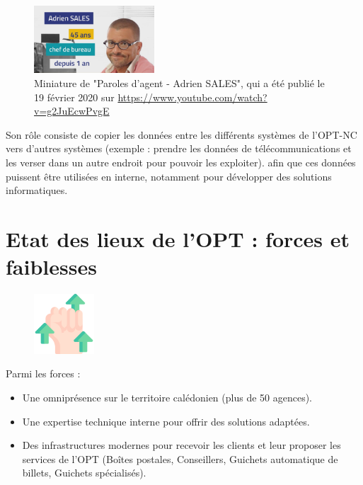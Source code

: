 \documentclass[12pt,a4paper]{report}
\begin{document}
\vspace{1cm}
\begin{figure}[h] %
    \centering
    \includegraphics[width=0.4\textwidth]{ressources_rapport/paroles_agent.jpg}
    \caption{Miniature de "Paroles d'agent - Adrien SALES", qui a été publié le 19 février 2020 sur \href{https://www.youtube.com/watch?v=g2JuEcwPvgE}{https://www.youtube.com/watch?v=g2JuEcwPvgE}}
\end{figure}
Son rôle consiste de copier les données entre les différents systèmes de l'OPT-NC vers d'autres systèmes (exemple : prendre les données de télécommunications et les verser dans un autre endroit pour pouvoir les exploiter). afin que ces données puissent être utilisées en interne, notamment pour développer des solutions informatiques.
\newpage

\section{Etat des lieux de l'OPT : forces et faiblesses}
\begin{figure}[h] %
    \centering
    \includegraphics[width=0.2\textwidth]{ressources_rapport/forces.png}
\end{figure}
Parmi les forces : 
\begin{itemize}
    \item Une omniprésence sur le territoire calédonien (plus de 50 agences).
    \item Une expertise technique interne pour offrir des solutions adaptées.
    \item Des infrastructures modernes pour recevoir les clients et leur proposer les services de l'OPT (Boîtes postales, Conseillers, Guichets automatique de billets, Guichets spécialisés).
\end{itemize}
\end{document}
